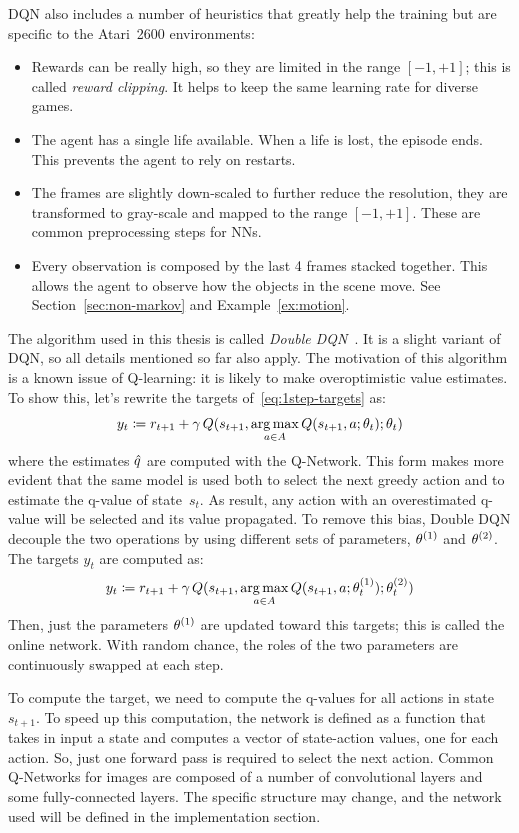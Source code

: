 DQN also includes a number of heuristics that greatly help the training
but are specific to the Atari~2600 environments:
\begin{itemize}
	\item Rewards can be really high, so they are limited in the range $[-1,
		+1]$; this is called \emph{reward clipping}. It helps to keep the same
		learning rate for diverse games.
	\item The agent has a single life available. When a life is lost, the
		episode ends. This prevents the agent to rely on restarts.
	\item The frames are slightly down-scaled to further reduce the resolution,
		they are transformed to gray-scale and mapped to the range $[-1, +1]$.
		These are common preprocessing steps for NNs.
	\item Every observation is composed by the last 4 frames stacked together.
		This allows the agent to observe how the objects in the scene move.
		See Section~\ref{sec:non-markov} and Example~\vref{ex:motion}.
\end{itemize}

The algorithm used in this thesis is called \emph{Double
DQN}~\cite{bib:double-q}. It is a slight variant of DQN, so all details
mentioned so far also apply. The motivation of this algorithm is a known issue
of Q-learning: it is likely to make overoptimistic value estimates.
To show this, let's rewrite the targets of~\eqref{eq:1step-targets} as:
\begin{equation}
	y_t \coloneqq r_{t+1} + \gamma \, Q(s_{t+1}, \operatorname*{arg\,max}_{a \in A} Q(s_{t+1},
	a; \theta_t); \theta_t)
\end{equation}
where the estimates $\hat{q}$ are computed with the Q-Network. This form makes
more evident that the same model is used both to select the next greedy action
and to estimate the q-value of state~$s_t$. As result, any action with an
overestimated q-value will be selected and its value propagated. To remove
this bias, Double DQN decouple the two operations by using different sets of
parameters, $\theta^{(1)}$ and $\theta^{(2)}$. The targets $y_t$ are
computed as:
\begin{equation}
	y_t \coloneqq r_{t+1} + \gamma \, Q(s_{t+1}, \operatorname*{arg\,max}_{a \in A} Q(s_{t+1},
	a; \theta_t^{(1)}); \theta_t^{(2)})
	\label{eq:double-q-targets}
\end{equation}
Then, just the parameters $\theta^{(1)}$ are updated toward this targets;
this is called the online network. With random chance, the roles of the two
parameters are continuously swapped at each step.

To compute the target, we need to compute the q-values for all actions in
state $s_{t+1}$. To speed up this computation, the network is defined as a
function that takes in input a state and computes a vector of state-action
values, one for each action. So, just one forward pass is required to select
the next action. Common Q-Networks for images are composed of a number of
convolutional layers and some fully-connected layers. The specific structure
may change, and the network used will be defined in the implementation section.

